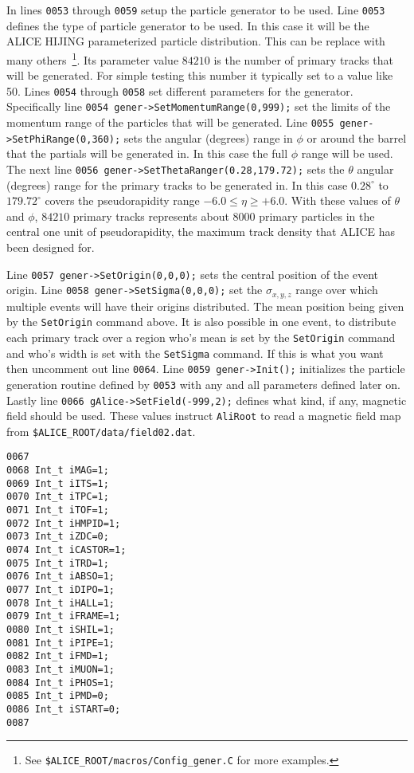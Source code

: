 In lines \texttt{0053} through \texttt{0059} setup the particle generator to be
used. Line \texttt{0053} defines the type of particle generator to be used. In
this case it will be the ALICE HIJING parameterized particle distribution. 
This can be replace with many others~\footnote{See
\texttt{\$ALICE\_ROOT/macros/Config\_gener.C} for more examples.}. Its
parameter value $84210$ is the number of primary tracks that will be
generated. For simple testing this number it typically set to a value like
50. Lines \texttt{0054} through \texttt{0058} set different parameters for the
generator. Specifically line \texttt{0054 gener->SetMomentumRange(0,999);} set
the limits of the momentum range of the particles that will be generated. Line
\texttt{0055 gener->SetPhiRange(0,360);} sets the angular (degrees) range in
$\phi$ or around the barrel that the partials will be generated in. In this
case the full $\phi$ range will be used. The next line \texttt{0056
gener->SetThetaRanger(0.28,179.72);} sets the $\theta$ angular (degrees) range
for the primary tracks to be generated in. In this case $0.28^{\circ}$ to
$179.72^{\circ}$ covers the pseudorapidity range $-6.0\leq \eta \geq
+6.0$. With these values of $\theta$ and $\phi$, $84210$ primary tracks
represents about $8000$ primary particles in the central one unit of
pseudorapidity, the maximum track density that ALICE has been designed for.

Line \texttt{0057 gener->SetOrigin(0,0,0);} sets the central position of the
event origin. Line \texttt{0058 gener->SetSigma(0,0,0);} set the
$\sigma_{x,y,z}$ range over which multiple events will have their origins
distributed. The mean position being given by the \texttt{SetOrigin} command
above. It is also possible in one event, to distribute each primary track over
a region who's mean is set by the \texttt{SetOrigin} command and who's width is
set with the \texttt{SetSigma} command. If this is what you want then uncomment
out line \texttt{0064}. Line \texttt{0059 gener->Init();} initializes the
particle generation routine defined by \texttt{0053} with any and all
parameters defined later on. Lastly line \texttt{0066
gAlice->SetField(-999,2);} defines what kind, if any, magnetic field should be
used. These values instruct \texttt{AliRoot} to read a magnetic field map from
\texttt{\$ALICE\_ROOT/data/field02.dat}.

\scriptsize
\begin{verbatim}
0067 
0068 Int_t iMAG=1;
0069 Int_t iITS=1;
0070 Int_t iTPC=1;
0071 Int_t iTOF=1;
0072 Int_t iHMPID=1;
0073 Int_t iZDC=0;
0074 Int_t iCASTOR=1;
0075 Int_t iTRD=1;
0076 Int_t iABSO=1;
0077 Int_t iDIPO=1;
0078 Int_t iHALL=1;
0079 Int_t iFRAME=1;
0080 Int_t iSHIL=1;
0081 Int_t iPIPE=1;
0082 Int_t iFMD=1;
0083 Int_t iMUON=1;
0084 Int_t iPHOS=1;
0085 Int_t iPMD=0;
0086 Int_t iSTART=0;
0087 
\end{verbatim}
\normalsize

